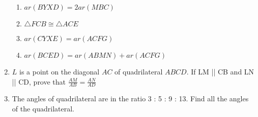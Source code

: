 \begin{enumerate}[label=\thesection.\arabic*.,ref=\thesection.\theenumi]
\begin{enumerate}
\item $ar (BYXD) = 2 ar (MBC)$ 
\item $ \triangle  FCB \cong  \triangle  ACE$
\item $ar (CYXE) = ar (ACFG)$
\item  $ar (BCED) = ar (ABMN) + ar (ACFG)$
\end{enumerate}
\item $L$ is a point on the diagonal $AC$ of quadrilateral $ABCD$.  If LM || CB and LN || CD, prove that $\frac{AM}{AB}=\frac{ AN}{  AD}$
\item The angles of quadrilateral are in the ratio 3 : 5 : 9 : 13. Find all the angles of the quadrilateral.
%

\end{enumerate}
